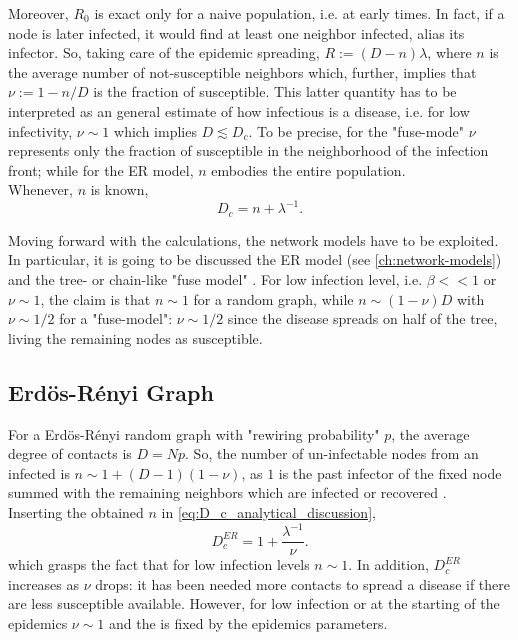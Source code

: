 \documentclass[a4paper,10pt,twoside]{book} %
\theoremstyle{definition}
\begin{document}
Moreover, $R_0$ is exact only for a naive population, i.e. at early times. In fact, if a node is later infected, it would find at least one neighbor infected, alias its infector. So, taking care of the epidemic spreading, $R := (D-n)\lambda$, where $n$ is the average number of not-susceptible neighbors which, further, implies that $\nu := 1 - n/D$ is the fraction of susceptible. This latter quantity has to be interpreted as an general estimate of how infectious is a disease, i.e. for low infectivity, $\nu\sim1$ which implies $D \lesssim D_c$.
To be precise, for the "fuse-mode" $\nu$ represents only the fraction of susceptible in the neighborhood of the infection front; while for the ER model, $n$ embodies the entire population.
\\Whenever, $n$ is known, 
\begin{equation}
	D_c = n + \lambda^{-1}.
	\label{eq:D_c_analytical_discussion}
\end{equation}   

Moving forward with the calculations, the network models have to be exploited. In particular, it is going to be discussed the ER model (see \autoref{ch:network-models}) and the tree- or chain-like "fuse model" \cite{Thurner::NetBasedExpl}. For low infection level, i.e. $\beta<<1$ or $\nu\sim1$, the claim is that $n\sim 1$ for a random graph, while $n \sim (1-\nu)D$ with $\nu\sim 1/2$ for a "fuse-model": $\nu\sim 1/2$ since the disease spreads on half of the tree, living the remaining nodes as susceptible. 

\subsection*{Erdös-Rényi Graph}
For a Erdös-Rényi random graph with "rewiring probability" $p$, the average degree of contacts is $D = Np$. So, the number of un-infectable nodes from an infected is $n \sim 1 + (D-1)(1-\nu)$, as $1$ is the past infector of the fixed node summed with the remaining neighbors which are infected or recovered \cite{Thurner::Appendix_NetBasedExpl}. 
\\Inserting the obtained $n$ in \autoref{eq:D_c_analytical_discussion}, 
\begin{equation}
	D_c^{ER} = 1 + \frac{ \lambda^{-1} }{\nu}.
	\label{eq:Dc_ERenyi}
\end{equation}
which grasps the fact that for low infection levels $n\sim1$. 
In addition, $D_c^{ER}$ increases as $\nu$ drops: it has been needed more contacts to spread a disease if there are less susceptible available. However, for low infection or at the starting of the epidemics $\nu \sim 1$ and the is fixed by the epidemics parameters.
\end{document}
